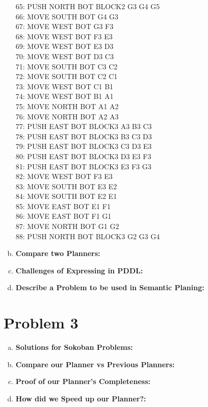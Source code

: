 \documentclass[]{article}
\begin{document}
\begin{enumerate}[(a)]
		          65: PUSH NORTH BOT BLOCK2 G3 G4 G5\\
		          66: MOVE SOUTH BOT G4 G3\\
		          67: MOVE WEST BOT G3 F3\\
		          68: MOVE WEST BOT F3 E3\\
		          69: MOVE WEST BOT E3 D3\\
		          70: MOVE WEST BOT D3 C3\\
		          71: MOVE SOUTH BOT C3 C2\\
		          72: MOVE SOUTH BOT C2 C1\\
		          73: MOVE WEST BOT C1 B1\\
		          74: MOVE WEST BOT B1 A1\\
		          75: MOVE NORTH BOT A1 A2\\
		          76: MOVE NORTH BOT A2 A3\\
		          77: PUSH EAST BOT BLOCK3 A3 B3 C3\\
		          78: PUSH EAST BOT BLOCK3 B3 C3 D3\\
		          79: PUSH EAST BOT BLOCK3 C3 D3 E3\\
		          80: PUSH EAST BOT BLOCK3 D3 E3 F3\\
		          81: PUSH EAST BOT BLOCK3 E3 F3 G3\\
		          82: MOVE WEST BOT F3 E3\\
		          83: MOVE SOUTH BOT E3 E2\\
		          84: MOVE SOUTH BOT E2 E1\\
		          85: MOVE EAST BOT E1 F1\\
		          86: MOVE EAST BOT F1 G1\\
		          87: MOVE NORTH BOT G1 G2\\
		          88: PUSH NORTH BOT BLOCK3 G2 G3 G4\\
		\item \textbf{Compare two Planners:}\\
		\item \textbf{Challenges of Expressing in PDDL:}\\
		\item \textbf{Describe a Problem to be used in Semantic Planing:}\\
	\end{enumerate}
\section{Problem 3}
	\begin{enumerate}[(a)]
		\item \textbf{Solutions for Sokoban Problems:}\\
		\item \textbf{Compare our Planner vs Previous Planners:}\\
		\item \textbf{Proof of our Planner's Completeness:}\\
		\item \textbf{How did we Speed up our Planner?:}\\
	\end{enumerate}
	
\end{document}
